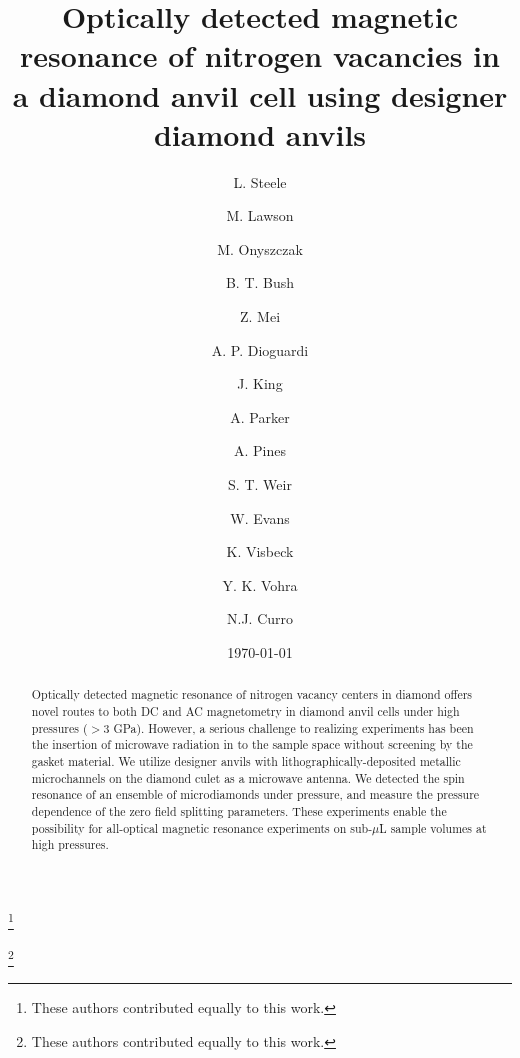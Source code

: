 \documentclass[%
 aip,
 sd,%
 amsmath,amssymb,
 reprint,%
 longbibliography
]{revtex4-1}
\begin{document}

\title{Optically detected magnetic resonance of nitrogen vacancies in a diamond anvil cell using designer diamond anvils}

\author{L. Steele}
\thanks{These authors contributed equally to this work.}
\author{M. Lawson}
\thanks{These authors contributed equally to this work.}
\author{M. Onyszczak}
\author{B. T. Bush}
\author{Z. Mei}
\author{A. P. Dioguardi}
\author{J. King}
\author{A. Parker}
\author{A. Pines}
\author{S. T. Weir}
\author{W.  Evans}
\author{K. Visbeck}
\author{Y. K. Vohra}
\author{N.J. Curro}

\date{\today}%

\begin{abstract}
Optically detected magnetic resonance of nitrogen vacancy centers in diamond offers novel routes to both DC and AC magnetometry in diamond anvil cells under high pressures ($>3$ GPa).  However, a serious challenge to realizing experiments has been the insertion of microwave radiation in to the sample space without screening by the gasket material.  We utilize designer anvils with lithographically-deposited metallic microchannels on the diamond culet as a microwave antenna.  We detected the spin resonance of an ensemble of microdiamonds under pressure, and measure the pressure dependence of the zero field splitting parameters.  These experiments enable the possibility for all-optical magnetic resonance experiments on sub-$\mu$L sample volumes at high pressures.
\end{abstract}
\end{document}
